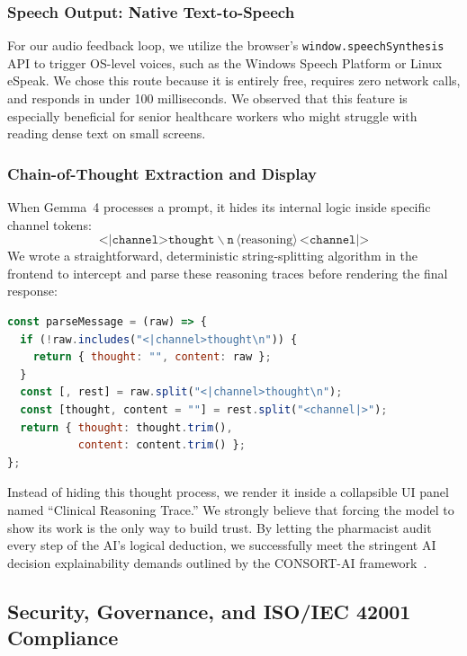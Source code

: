 \documentclass[9pt,conference]{IEEEtran}
\begin{document}
\subsubsection{Speech Output: Native Text-to-Speech}

For our audio feedback loop, we utilize the browser's \texttt{window.speechSynthesis} API to trigger OS-level voices, such as the Windows Speech Platform or Linux eSpeak. We chose this route because it is entirely free, requires zero network calls, and responds in under 100 milliseconds. We observed that this feature is especially beneficial for senior healthcare workers who might struggle with reading dense text on small screens.

\subsubsection{Chain-of-Thought Extraction and Display}

When Gemma~4 processes a prompt, it hides its internal logic inside specific channel tokens:
\begin{equation}
  \texttt{<|channel>thought}\backslash\texttt{n}\,\langle\text{reasoning}\rangle\,\texttt{<channel|>}
\end{equation}
We wrote a straightforward, deterministic string-splitting algorithm in the frontend to intercept and parse these reasoning traces before rendering the final response:

\begin{lstlisting}[language=JavaScript, caption=Chain-of-thought extraction]
const parseMessage = (raw) => {
  if (!raw.includes("<|channel>thought\n")) {
    return { thought: "", content: raw };
  }
  const [, rest] = raw.split("<|channel>thought\n");
  const [thought, content = ""] = rest.split("<channel|>");
  return { thought: thought.trim(),
           content: content.trim() };
};
\end{lstlisting}

Instead of hiding this thought process, we render it inside a collapsible UI panel named ``Clinical Reasoning Trace.'' We strongly believe that forcing the model to show its work is the only way to build trust. By letting the pharmacist audit every step of the AI's logical deduction, we successfully meet the stringent AI decision explainability demands outlined by the CONSORT-AI framework~\cite{liu2023reporting}.

\subsection{Security, Governance, and ISO/IEC 42001 Compliance}
\label{subsec:security}
\end{document}

